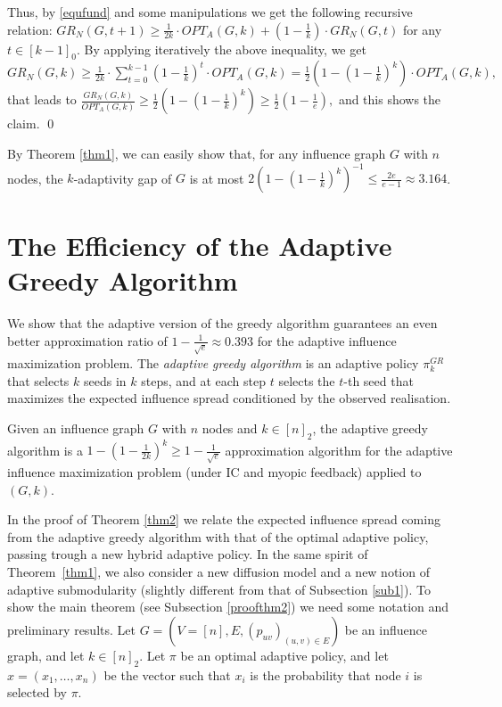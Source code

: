 Thus, by \eqref{equfund} and some manipulations we get the following recursive relation: $
{GR}_N(G,t+1)\geq \frac{1}{2k}\cdot OPT_A(G,k)+\left(1-\frac{1}{k}\right)\cdot {GR}_N(G,t)$ for any $t\in [k-1]_0.$ By applying iteratively the above inequality, we get
$
{GR}_N(G,k)\geq \frac{1}{2k}\cdot \sum_{t=0}^{k-1}\left(1-\frac{1}{k}\right)^{t}\cdot OPT_A(G,k)=\frac{1}{2}\left(1-\left(1-\frac{1}{k}\right)^{k}\right)\cdot OPT_A(G,k),
$
that leads to $
\frac{{GR}_N(G,k)}{OPT_A(G,k)}\geq \frac{1}{2}\left(1-\left(1-\frac{1}{k}\right)^{k}\right) \geq \frac{1}{2}\left(1-\frac{1}{e}\right),$
and this shows the claim. \qed

\begin{remark}\label{adgapcor}
By Theorem \ref{thm1}, we can easily show that, for any influence graph $G$ with $n$ nodes, the $k$-adaptivity gap of $G$ is at most $2\left(1-\left(1-\frac{1}{k}\right)^{k}\right)^{-1}\leq \frac{2e}{e-1}\approx 3.164$. 
\end{remark}

\section{The Efficiency of the Adaptive Greedy Algorithm}\label{ad-sec}
We show that the adaptive version of the greedy algorithm guarantees an even better approximation ratio of $1-\frac{1}{\sqrt{e}}\approx 0.393$ for the adaptive influence maximization problem. The {\em adaptive greedy algorithm} is an adaptive policy $\pi^{GR}_{k}$ that selects $k$ seeds in $k$ steps, and at each step $t$ selects the $t$-th seed that maximizes the expected influence spread conditioned by the observed realisation. 
\begin{theorem}\label{thm2}
Given an influence graph $G$ with $n$ nodes and $k\in [n]_2$, the adaptive greedy algorithm is a $1-\left(1-\frac{1}{2k}\right)^{k}\geq 1-\frac{1}{\sqrt{e}}$ approximation algorithm for the adaptive influence maximization problem (under IC and  myopic feedback) applied to $(G,k)$. 
\end{theorem}
In the proof of Theorem \ref{thm2} we relate the expected influence spread coming from the adaptive greedy algorithm with that of the optimal adaptive policy, passing trough a new hybrid adaptive policy. In the same spirit of Theorem~\ref{thm1}, we also consider a new diffusion model and a new notion of adaptive submodularity (slightly different from that of Subsection \ref{sub1}). To show the main theorem (see Subsection \ref{proofthm2}) we need some notation and preliminary results. Let $G=(V=[n],E,(p_{uv})_{(u,v)\in E})$ be an influence graph, and let $k\in[n]_2$. Let $\pi$ be an optimal adaptive policy, and let $x=(x_1,\ldots, x_n)$ be the vector such that $x_i$ is the probability that node $i$ is selected by $\pi$. 

